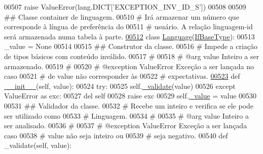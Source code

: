 \begin{DoxyCode}
00507             \textcolor{keywordflow}{raise} ValueError(lang.DICT[\textcolor{stringliteral}{'EXCEPTION\_INV\_ID\_S'}])
00508 
00509 \textcolor{comment}{## Classe container de linguagem.}
00510 \textcolor{comment}{#   Irá armazenar um número que corresponde à língua de preferência do}
00511 \textcolor{comment}{#   usuário. A relação linguagem-id será armazenada numa tabela à parte.}
\hypertarget{BaseUnit_8py_source_l00512}{}\hyperlink{classELO_1_1BaseUnit_1_1Language}{00512} \textcolor{keyword}{class }\hyperlink{classELO_1_1BaseUnit_1_1Language}{Language}(\hyperlink{classELO_1_1BaseUnit_1_1IfBaseType}{IfBaseType}):
00513     \_value = \textcolor{keywordtype}{None}
00514 
00515     \textcolor{comment}{## Construtor da classe.}
00516     \textcolor{comment}{#   Impede a criação de tipos básicos com conteúdo inválido.}
00517     \textcolor{comment}{#}
00518     \textcolor{comment}{#   @arg        value       Inteiro a ser armazenado.}
00519     \textcolor{comment}{#}
00520     \textcolor{comment}{#   @exception  ValueError  Exceção a ser lançada no caso}
00521     \textcolor{comment}{#                           de value não corresponder às}
00522     \textcolor{comment}{#                           expectativas.}
\hypertarget{BaseUnit_8py_source_l00523}{}\hyperlink{classELO_1_1BaseUnit_1_1Language_a14a17f80e86f12e135cb33d05efbf502}{00523}     \textcolor{keyword}{def }\hyperlink{classELO_1_1BaseUnit_1_1Language_a14a17f80e86f12e135cb33d05efbf502}{\_\_init\_\_}(self, value):
00524         \textcolor{keywordflow}{try}:
00525             self.\hyperlink{classELO_1_1BaseUnit_1_1IfBaseType_acf84c5906a39b605a23ab68c4ca1dd19}{\_validate}(value)
00526         \textcolor{keywordflow}{except} ValueError \textcolor{keyword}{as} exc:
00527             del self
00528             \textcolor{keywordflow}{raise} exc
00529         self.\hyperlink{classELO_1_1BaseUnit_1_1IfBaseType_ad05d9d377fc4b99743c022cc8f6019d7}{\_value} = value
00530 
00531     \textcolor{comment}{## Validador da classe.}
00532     \textcolor{comment}{#   Recebe um inteiro e verifica se ele pode ser utilizado como}
00533     \textcolor{comment}{#   Linguagem.}
00534     \textcolor{comment}{#}
00535     \textcolor{comment}{#   @arg        value       Inteiro a ser analisado.}
00536     \textcolor{comment}{#}
00537     \textcolor{comment}{#   @exception  ValueError  Exceção a ser lançada caso}
00538     \textcolor{comment}{#                           value não seja inteiro ou}
00539     \textcolor{comment}{#                           seja negativo.}
00540     \textcolor{keyword}{def }\_validate(self, value):

\end{DoxyCode}
